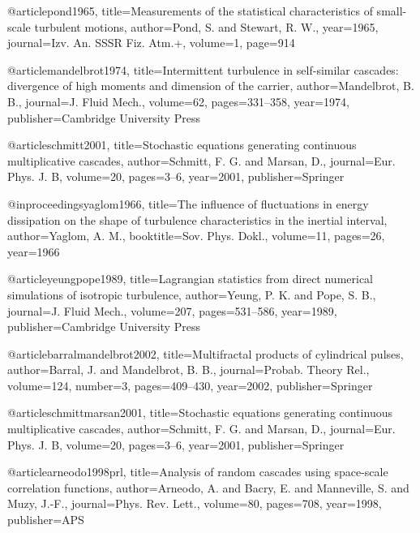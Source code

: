 @article{pond1965,
  title={Measurements of the statistical characteristics of small-scale turbulent motions},
  author={Pond, S. and Stewart, R. W.},
  year={1965},
  journal={Izv. An. SSSR Fiz. Atm.+},
  volume={1},
  page={914}
  }

@article{mandelbrot1974,
  title={Intermittent turbulence in self-similar cascades: divergence of high moments and dimension of the carrier},
  author={Mandelbrot, B. B.},
  journal={J. Fluid Mech.},
  volume={62},
  pages={331--358},
  year={1974},
  publisher={Cambridge University Press}
}

@article{schmitt2001,
  title={Stochastic equations generating continuous multiplicative cascades},
  author={Schmitt, F. G. and Marsan, D.},
  journal={Eur. Phys. J. B},
  volume={20},
  pages={3--6},
  year={2001},
  publisher={Springer}
}

@inproceedings{yaglom1966,
  title={The influence of fluctuations in energy dissipation on the shape of turbulence characteristics in the inertial interval},
  author={Yaglom, A. M.},
  booktitle={Sov. Phys. Dokl.},
  volume={11},
  pages={26},
  year={1966}
}

@article{yeungpope1989,
  title={Lagrangian statistics from direct numerical simulations of isotropic turbulence},
  author={Yeung, P. K. and Pope, S. B.},
  journal={J. Fluid Mech.},
  volume={207},
  pages={531--586},
  year={1989},
  publisher={Cambridge University Press}
}

@article{barralmandelbrot2002,
  title={Multifractal products of cylindrical pulses},
  author={Barral, J. and Mandelbrot, B. B.},
  journal={Probab. Theory Rel.},
  volume={124},
  number={3},
  pages={409--430},
  year={2002},
  publisher={Springer}
}

@article{schmittmarsan2001,
  title={Stochastic equations generating continuous multiplicative cascades},
  author={Schmitt, F. G. and Marsan, D.},
  journal={Eur. Phys. J. B},
  volume={20},
  pages={3--6},
  year={2001},
  publisher={Springer}
}

@article{arneodo1998prl,
  title={Analysis of random cascades using space-scale correlation functions},
  author={Arneodo, A. and Bacry, E. and Manneville, S. and Muzy, J.-F.},
  journal={Phys. Rev. Lett.},
  volume={80},
  pages={708},
  year={1998},
  publisher={APS}
}

